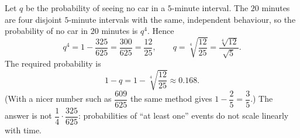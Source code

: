 Let $q$ be the probability of seeing no car in a $5$-minute interval. The $20$ minutes are four disjoint $5$-minute intervals with the same, independent behaviour, so the probability of no car in $20$ minutes is $q^4$. Hence
\[
q^4=1-\dfrac{325}{625}=\dfrac{300}{625}=\dfrac{12}{25},\qquad q=\sqrt[4]{\dfrac{12}{25}}=\dfrac{\sqrt[4]{12}}{\sqrt5}.
\]
The required probability is
\[
1-q=\boxed{1-\sqrt[4]{\dfrac{12}{25}}}\approx0.168 .
\]
(With a nicer number such as $\dfrac{609}{625}$ the same method gives $1-\dfrac{2}{5}=\dfrac{3}{5}$.) The answer is not $\dfrac{1}{4}\cdot\dfrac{325}{625}$: probabilities of ``at least one'' events do not scale linearly with time.
